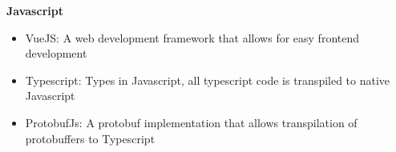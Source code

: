 \center \textbf{Javascript}
\begin{itemize}
    \item VueJS: A web development framework that allows for easy frontend development
    \item Typescript: Types in Javascript, all typescript code is transpiled to native Javascript
    \item ProtobufJs: A protobuf implementation that allows transpilation of protobuffers to Typescript
\end{itemize}
